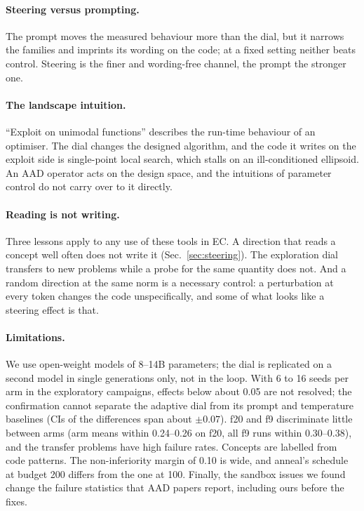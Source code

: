 \paragraph{Steering versus prompting.}
The prompt moves the measured behaviour more than the dial, but it
narrows the families and imprints its wording on the code; at a fixed
setting neither beats control. Steering is the finer and wording-free
channel, the prompt the stronger one.

\paragraph{The landscape intuition.}
``Exploit on unimodal functions'' describes the run-time behaviour of an
optimiser. The dial changes the designed algorithm, and the code it
writes on the exploit side is single-point local search, which stalls
on an ill-conditioned ellipsoid. An AAD operator acts on the design
space, and the intuitions of parameter control do not carry over to it
directly.

\paragraph{Reading is not writing.}
Three lessons apply to any use of these tools in EC. A direction that
reads a concept well often does not write it (Sec.~\ref{sec:steering}).
The exploration dial transfers to new problems while a probe for the
same quantity does not. And a random direction at the same norm is a
necessary control: a perturbation at every token changes the code
unspecifically, and some of what looks like a steering effect is that.

\paragraph{Limitations.}
We use open-weight models of 8--14B parameters; the dial is
replicated on a second model in single generations only, not in the
loop. With 6 to 16 seeds per arm in the exploratory campaigns, effects
below about 0.05 \aocc are not resolved; the confirmation cannot separate the adaptive dial from
its prompt and temperature baselines (CIs of the differences span about
$\pm0.07$). f20 and f9 discriminate little between arms (arm means within 0.24--0.26 on f20, all f9 runs within
0.30--0.38), and the transfer problems have high
failure rates. Concepts are labelled from code patterns. The
non-inferiority margin of 0.10 \aocc is wide, and anneal's schedule at
budget 200 differs from the one at 100. Finally, the sandbox issues we
found change the failure statistics that AAD papers report, including
ours before the fixes.
